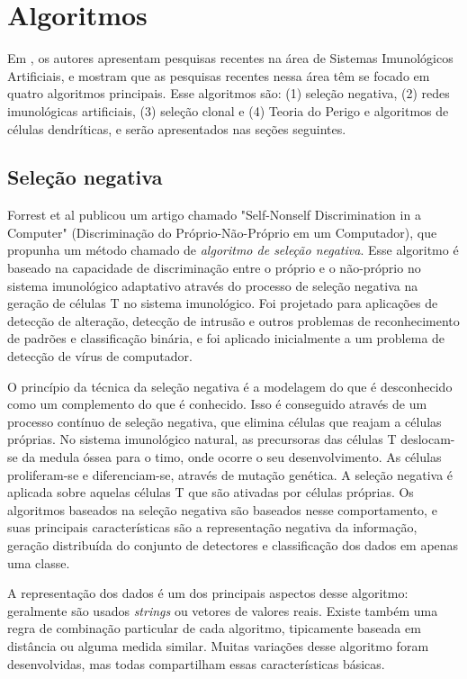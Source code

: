 \section{Algoritmos}

Em \citet{Dasgupta2010}, os autores apresentam pesquisas recentes na área de Sistemas Imunológicos Artificiais, e mostram que as pesquisas recentes nessa área têm se focado em quatro algoritmos principais. Esse algoritmos são: (1) seleção negativa, (2) redes imunológicas artificiais, (3) seleção clonal e (4) Teoria do Perigo e algoritmos de células dendríticas, e serão apresentados nas seções seguintes.

\subsection{Seleção negativa}

Forrest et al \cite{Forrest1994} publicou um artigo chamado "Self-Nonself Discrimination in a Computer" (Discriminação do Próprio-Não-Próprio em um Computador), que propunha um método chamado de \emph{algoritmo de seleção negativa}. Esse algoritmo é baseado na capacidade de discriminação entre o próprio e o não-próprio no sistema imunológico adaptativo através do processo de seleção negativa na geração de células T no sistema imunológico. Foi projetado para aplicações de detecção de alteração, detecção de intrusão e outros problemas de reconhecimento de padrões e classificação binária, e foi aplicado inicialmente a um problema de detecção de vírus de computador.

 O princípio da técnica da seleção negativa é a modelagem do que é desconhecido como um complemento do que é conhecido. Isso é conseguido através de um processo contínuo de seleção negativa, que elimina células que reajam a células próprias. No sistema imunológico natural, as precursoras das células T deslocam-se da medula óssea para o timo, onde ocorre o seu desenvolvimento. As células proliferam-se e diferenciam-se, através de mutação genética. A seleção negativa é aplicada sobre aquelas células T que são ativadas por células próprias. Os algoritmos baseados na seleção negativa são baseados nesse comportamento, e suas principais características são a representação negativa da informação, geração distribuída do conjunto de detectores e classificação dos dados em apenas uma classe.

A representação dos dados é um dos principais aspectos desse algoritmo: geralmente são usados \emph{strings} ou vetores de valores reais. Existe também uma regra de combinação particular de cada algoritmo, tipicamente baseada em distância ou alguma medida similar. Muitas variações desse algoritmo foram desenvolvidas, mas todas compartilham essas características básicas.


